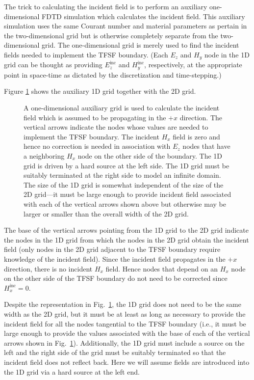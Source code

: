 The trick to calculating the incident field is to perform an auxiliary
one-dimensional FDTD simulation which calculates the incident field.
This auxiliary simulation uses the same Courant number and material
parameters as pertain in the two-dimensional grid but is otherwise
completely separate from the two-dimensional grid.  The
one-dimensional grid is merely used to find the incident fields needed
to implement the TFSF boundary.  (Each $E_z$ and $H_y$ node in the 1D
grid can be thought as providing $E_z^{\mathrm{inc}}$ and
$H_y^{\mathrm{inc}}$, respectively, at the appropriate point in
space-time as dictated by the discretization and time-stepping.)

Figure \ref{fig:tmzTfsfWith1D} shows the auxiliary 1D grid together
with the 2D grid.
\begin{figure}
  \begin{center}
  \end{center} 
  \caption{A one-dimensional auxiliary grid is used to calculate the
  incident field which is assumed to be propagating in the $+x$
  direction.  The vertical arrows indicate the nodes whose values are
  needed to implement the TFSF boundary.  The incident $H_x$ field is
  zero and hence no correction is needed in association with $E_z$
  nodes that have a neighboring $H_x$ node on the other side of the
  boundary.  The 1D 
  grid is driven by a hard source at the left side.  The 1D grid must
  be suitably terminated at the right side to model an infinite domain.
  The size of the 1D grid is somewhat independent of the size of the
  2D grid---it must be large enough to provide incident field
  associated with each of the vertical arrows shown above but
  otherwise may be larger or smaller than the overall width of the 2D grid.
  \label{fig:tmzTfsfWith1D}}
\end{figure}
The base of the vertical arrows pointing from the 1D grid to the 2D
grid indicate the nodes in the 1D grid from which the nodes in the 2D
grid obtain the incident field (only nodes in the 2D grid adjacent to
the TFSF boundary require knowledge of the incident field).  Since the
incident field propagates in the $+x$ direction, there is no incident
$H_x$ field.  Hence nodes that depend on an $H_x$ node on the other
side of the TFSF boundary do not need to be corrected since
$H_x^{\mathrm{inc}}=0$.  

Despite the representation in Fig.\ \ref{fig:tmzTfsfWith1D}, the 1D
grid does not need to be the same width as the 2D grid, but it must be
at least as long as necessary to provide the incident field for all
the nodes tangential to the TFSF boundary (i.e., it must be large
enough to provide the values associated with the base of each of the
vertical arrows shown in Fig.\ \ref{fig:tmzTfsfWith1D}).
Additionally, the 1D grid must include a source on the left and the
right side of the grid must be suitably terminated so that the
incident field does not reflect back.  Here we will assume fields are
introduced into the 1D grid via a hard source at the left end.

